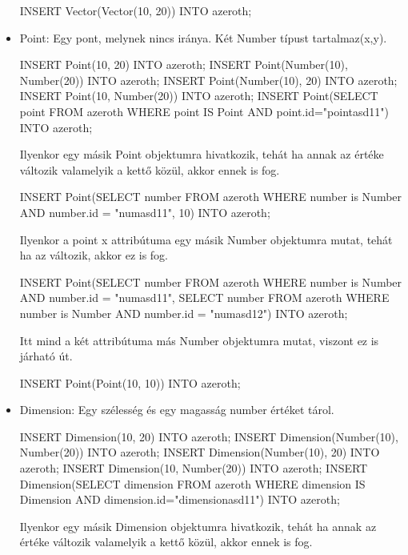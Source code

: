 \begin{itemize}
\begin{sql}
INSERT Vector(Vector(10, 20)) INTO azeroth;
\end{sql}

\item Point: Egy pont, melynek nincs iránya. Két Number típust tartalmaz(x,y).

\begin{sql}
INSERT Point(10, 20) INTO azeroth;
INSERT Point(Number(10), Number(20)) INTO azeroth;
INSERT Point(Number(10), 20) INTO azeroth;
INSERT Point(10, Number(20)) INTO azeroth;
INSERT Point(SELECT point FROM azeroth WHERE point IS Point AND point.id="pointasd11") INTO azeroth;
\end{sql}

Ilyenkor egy másik Point objektumra hivatkozik, tehát ha annak az értéke változik valamelyik a kettő közül, akkor ennek is fog.

\begin{sql}
INSERT Point(SELECT number FROM azeroth WHERE number is Number AND number.id = "numasd11", 10) INTO azeroth;
\end{sql}

Ilyenkor a point x attribútuma egy másik Number objektumra mutat, tehát ha az változik, akkor ez is fog.
\begin{sql}
INSERT Point(SELECT number FROM azeroth WHERE number is Number AND number.id = "numasd11", SELECT number FROM azeroth WHERE number is Number AND number.id = "numasd12") INTO azeroth;
\end{sql}

Itt mind a két attribútuma más Number objektumra mutat, viszont ez is járható út.
\begin{sql}
INSERT Point(Point(10, 10)) INTO azeroth;
\end{sql}

\item Dimension: Egy szélesség és egy magasság number értéket tárol.
\begin{sql}
INSERT Dimension(10, 20) INTO azeroth;
INSERT Dimension(Number(10), Number(20)) INTO azeroth;
INSERT Dimension(Number(10), 20) INTO azeroth;
INSERT Dimension(10, Number(20)) INTO azeroth;
INSERT Dimension(SELECT dimension FROM azeroth WHERE dimension IS Dimension AND dimension.id="dimensionasd11") INTO azeroth;
\end{sql}

Ilyenkor egy másik Dimension objektumra hivatkozik, tehát ha annak az értéke változik valamelyik a kettő közül, akkor ennek is fog.


\end{itemize}

